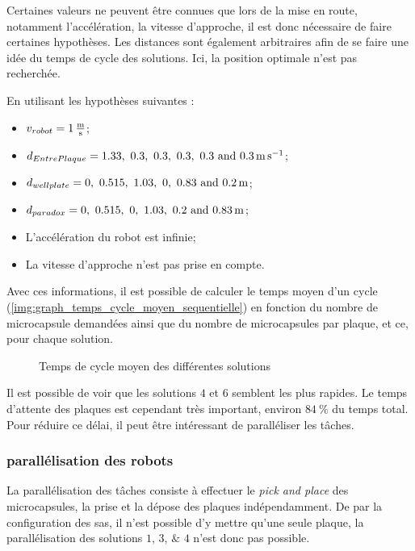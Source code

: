 Certaines valeurs ne peuvent être connues que lors de la mise en route, notamment l'accélération, la vitesse d'approche, il est donc nécessaire de faire certaines hypothèses. Les distances sont également arbitraires afin de se faire une idée du temps de cycle des solutions. Ici, la position optimale n'est pas recherchée.

En utilisant les hypothèses suivantes :
\begin{itemize}
    \item $v_{robot} = \qty{1}{\frac{\m}{\s}}$;
    \item $d_{EntrePlaque} = \qtylist[list-units = single]{1.33; 0.3; 0.3; 0.3; 0.3; 0.3}{\m\per\s}$;
    \item $d_{wellplate} = \qtylist[list-units = single]{0; 0.515; 1.03; 0; 0.83; 0.2 }{\m}$;
    \item $d_{paradox} =      \qtylist[list-units = single]{0; 0.515; 0; 1.03; 0.2; 0.83 }{\m}$;
    \item L'accélération du robot est infinie;
    \item La vitesse d'approche n'est pas prise en compte.
\end{itemize}
Avec ces informations, il est possible de calculer le temps moyen d'un cycle (\cf \autoref{img:graph_temps_cycle_moyen_sequentielle}) en fonction du nombre de \gls{microcapsule} demandées ainsi que du nombre de \glspl{microcapsule} par plaque, et ce, pour chaque solution.
\begin{figure}[H]
    \centering
    
    \caption{Temps de cycle moyen des différentes solutions}
    \label{img:graph_temps_cycle_moyen_sequentielle}
\end{figure}
Il est possible de voir que les solutions $4$ et $6$ semblent les plus rapides. Le temps d'attente des plaques est cependant très important, environ $84~\%$ du temps total. Pour réduire ce délai, il peut être intéressant de paralléliser les tâches.
\subsubsection{parallélisation des robots}
La parallélisation des tâches consiste à effectuer le \textit{pick and place} des \glspl{microcapsule}, la prise et la dépose des plaques indépendamment.
De par la configuration des sas, il n'est possible d'y mettre qu'une seule plaque, la parallélisation des solutions $\numlist{1; 3; 4}$ n'est donc pas possible.

